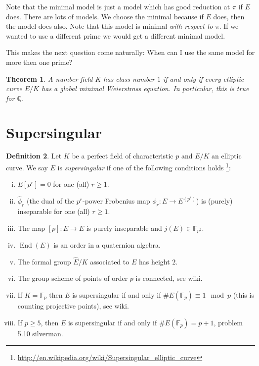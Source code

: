 \documentclass[11pt]{article}
\newcommand{\BB}[1]{\mathbb{#1}} %
\newcommand{\QQ}{\BB{Q}}
\newcommand{\FF}{\BB{F}}
\newcommand{\End}{\operatorname{End}}
\theoremstyle{plain}%
\newtheorem{thm}{Theorem}[section]
\theoremstyle{definition}
\newtheorem{defn}[thm]{Definition}
\theoremstyle{remark}
\begin{document}
Note that the minimal model is just a model which has good reduction at $\pi$ if $E$ does. There are lots of models. We choose the minimal because if $E$ does, then the model does also. Note that this model is minimal \emph{with respect to $\pi$}. If we wanted to use a different prime we would get a different minimal model.

This makes the next question come naturally: When can I use the same model for more then one prime?

\begin{thm} %
	A number field $K$ has class number $1$ if and only if every elliptic curve $E/K$ has a global minimal Weierstrass equation. In particular, this is true for $\QQ$.
\end{thm}

\section{Supersingular}

\begin{defn} %
	Let $K$ be a perfect field of characteristic $p$ and $E/K$ an elliptic curve. We say $E$ is \emph{supersingular} if one of the following conditions holds
	\footnote{\url{http://en.wikipedia.org/wiki/Supersingular\_elliptic\_curve}}:
	\begin{enumerate}[(i)]
		\item $E[p^r]=0$ for one (all) $r\geq 1$.
		\item $\hat{\phi}_r$ (the dual of the $p^r$-power Frobenius map $\phi_r:E\to E^{(p^r)}$) is (purely) inseparable for one (all) $r\geq 1$.
		\item The map $[p]:E\to E$ is purely inseparable and $j(E)\in\FF_{p^2}$.
		\item $\End(E)$ is an order in a quaternion algebra.
		\item The formal group $\hat{E}/K$ associated to $E$ has height $2$.
		\item The group scheme of points of order $p$ is connected, see wiki. %
		\item If $K=\FF_p$ then $E$ is supersingular if and only if $\#E(\FF_p)\equiv 1\mod{p}$ (this is counting projective points), see wiki.
		\item If $p\geq 5$, then $E$ is supersingular if and only if $\#E(\FF_p)=p+1$, problem 5.10 silverman.
	\end{enumerate}
\end{defn}
\end{document}
